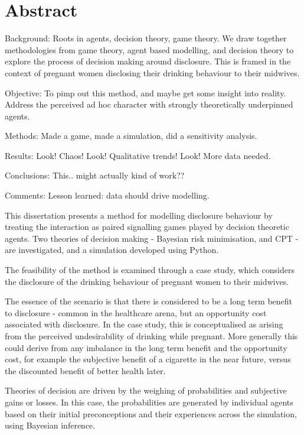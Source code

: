 \begingroup
\let\clearpage\relax
\let\cleardoublepage\relax



\section*{Abstract}

Background:
Roots in agents, decision theory, game theory.
We draw together methodologies from game theory, agent based modelling, and decision theory to explore the process of decision making around disclosure. This is framed in the context of pregnant women disclosing their drinking behaviour to their midwives.

Objective: 
To pimp out this method, and maybe get some insight into reality.
Address the perceived ad hoc character with strongly theoretically underpinned agents.

Methods: 
Made a game, made a simulation, did a sensitivity analysis.

Results: 
Look! Chaos! Look! Qualitative trends! Look! More data needed.

Conclusions:
This.. might actually kind of work??

Comments: 
Lesson learned: data should drive modelling.

This dissertation presents a method for modelling disclosure behaviour
by treating the interaction as paired signalling games played by decision
theoretic agents. Two theories of decision making - Bayesian risk
minimisation, and \ac{CPT} - are investigated, and a simulation developed
using Python.

The feasibility of the method is examined through a case study, which
considers the disclosure of the drinking behaviour of pregnant women
to their midwives. 

The essence of the scenario is that there is considered to be a long
term benefit to disclosure - common in the healthcare arena, but an
opportunity cost associated with disclosure. In the case study, this
is conceptualised as arising from the perceived undesirability of
drinking while pregnant. More generally this could derive from any
imbalance in the long term benefit and the opportunity cost, for example
the subjective benefit of a cigarette in the near future, versus the
discounted benefit of better health later.

Theories of decision are driven by the weighing of probabilities and
subjective gains or losses. In this case, the probabilities are generated
by individual agents based on their initial preconceptions and their
experiences across the simulation, using Bayesian inference.

